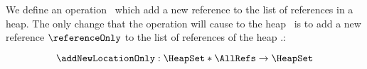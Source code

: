 




 We define an operation \addNewLocationOnly \  which add a new reference to the list of references in a heap.
 The only change that the operation will cause to the heap \heap \ is to add
 a new reference $\referenceOnly$ to the list of references of the heap \heap.\heapLocs:   

 $$ \addNewLocationOnly : \HeapSet *  \AllRefs   \rightarrow \HeapSet $$


